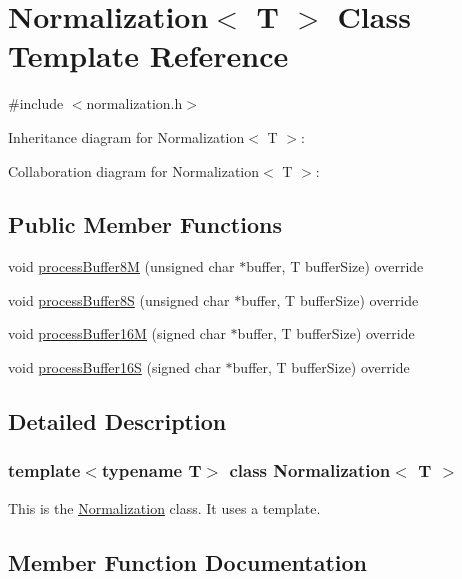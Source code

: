 \hypertarget{classNormalization}{}\section{Normalization$<$ T $>$ Class Template Reference}
\label{classNormalization}


{\ttfamily \#include $<$normalization.\+h$>$}



Inheritance diagram for Normalization$<$ T $>$\+:


Collaboration diagram for Normalization$<$ T $>$\+:
\subsection*{Public Member Functions}
\begin{DoxyCompactItemize}
\item 
void \hyperlink{classNormalization_ae9e63da4207cd62c8879c1ea386a593b}{process\+Buffer8M} (unsigned char $\ast$buffer, T buffer\+Size) override
\item 
void \hyperlink{classNormalization_a7cc8c3dd949989fc6da01ab6b76ddf9e}{process\+Buffer8S} (unsigned char $\ast$buffer, T buffer\+Size) override
\item 
void \hyperlink{classNormalization_af99efdb1bf9802d1180d32a88e9fe866}{process\+Buffer16M} (signed char $\ast$buffer, T buffer\+Size) override
\item 
void \hyperlink{classNormalization_a559502cea563e0bb0548177659473f7a}{process\+Buffer16S} (signed char $\ast$buffer, T buffer\+Size) override
\end{DoxyCompactItemize}


\subsection{Detailed Description}
\subsubsection*{template$<$typename T$>$\newline
class Normalization$<$ T $>$}

This is the \hyperlink{classNormalization}{Normalization} class. It uses a template. 

\subsection{Member Function Documentation}
\mbox{\label{classNormalization_af99efdb1bf9802d1180d32a88e9fe866}} 
